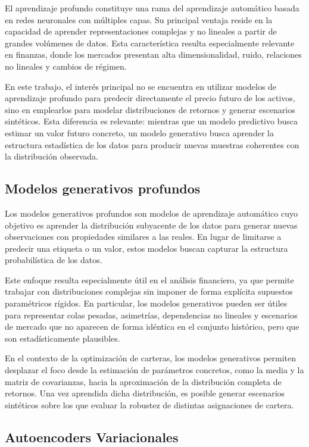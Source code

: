 El aprendizaje profundo constituye una rama del aprendizaje automático basada en redes neuronales con múltiples capas. Su principal ventaja reside en la capacidad de aprender representaciones complejas y no lineales a partir de grandes volúmenes de datos. Esta característica resulta especialmente relevante en finanzas, donde los mercados presentan alta dimensionalidad, ruido, relaciones no lineales y cambios de régimen.

En este trabajo, el interés principal no se encuentra en utilizar modelos de aprendizaje profundo para predecir directamente el precio futuro de los activos, sino en emplearlos para modelar distribuciones de retornos y generar escenarios sintéticos. Esta diferencia es relevante: mientras que un modelo predictivo busca estimar un valor futuro concreto, un modelo generativo busca aprender la estructura estadística de los datos para producir nuevas muestras coherentes con la distribución observada.

\subsection{Modelos generativos profundos}

Los modelos generativos profundos son modelos de aprendizaje automático cuyo objetivo es aprender la distribución subyacente de los datos para generar nuevas observaciones con propiedades similares a las reales. En lugar de limitarse a predecir una etiqueta o un valor, estos modelos buscan capturar la estructura probabilística de los datos.

Este enfoque resulta especialmente útil en el análisis financiero, ya que permite trabajar con distribuciones complejas sin imponer de forma explícita supuestos paramétricos rígidos. En particular, los modelos generativos pueden ser útiles para representar colas pesadas, asimetrías, dependencias no lineales y escenarios de mercado que no aparecen de forma idéntica en el conjunto histórico, pero que son estadísticamente plausibles.

En el contexto de la optimización de carteras, los modelos generativos permiten desplazar el foco desde la estimación de parámetros concretos, como la media y la matriz de covarianzas, hacia la aproximación de la distribución completa de retornos. Una vez aprendida dicha distribución, es posible generar escenarios sintéticos sobre los que evaluar la robustez de distintas asignaciones de cartera.

\subsection{Autoencoders Variacionales}

